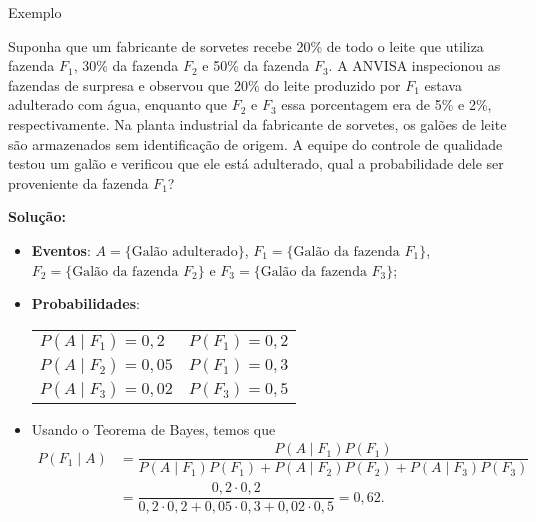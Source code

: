 \documentclass[9pt]{beamer}
\begin{document}
\begin{frame}{Exemplo}

{\scriptsize
Suponha que um fabricante de sorvetes recebe 20\% de todo o leite que utiliza fazenda $F_1$, 30\% da fazenda $F_2$ e 50\% da fazenda $F_3$. A ANVISA inspecionou as fazendas de surpresa e observou que 20\% do leite produzido por $F_1$ estava adulterado com água, enquanto que $F_2$ e $F_3$ essa porcentagem era de 5\% e 2\%, respectivamente. Na planta industrial da fabricante de sorvetes, os galões de leite são armazenados sem identificação de origem. A equipe do controle de qualidade testou um galão e verificou que ele está adulterado, qual a probabilidade dele ser proveniente da fazenda $F_1$?
\vfill

\textbf{Solução:}
	\begin{itemize}
	\item \textbf{Eventos}: $A=\{\mbox{Galão adulterado}\}$, $F_1 =\{\mbox{Galão da fazenda }F_1\}$, $F_2 =\{\mbox{Galão da fazenda }F_2\}$ e $F_3 =\{\mbox{Galão da fazenda }F_3\}$;
	\item \textbf{Probabilidades}:
	\begin{table}[ht]
		\begin{tabular}{l|l}
			\toprule[0.05cm]
			$P(A \mid F_1) = 0,2$ & $P(F_1) = 0,2$  \\
			$P(A \mid F_2) = 0,05$ & $P(F_1) = 0,3$  \\
			$P(A \mid F_3) = 0,02$ & $P(F_3) = 0,5$  \\
			\bottomrule[0.05cm]
		\end{tabular}
	\end{table}
	\item Usando o Teorema de Bayes, temos que
	\begin{align*}
	P(F_1 \mid A) &= \dfrac{ P(A \mid F_1) P(F_1) } {P(A \mid F_1) P(F_1) + P(A \mid F_2) P(F_2)+ P(A \mid F_3) P(F_3)}\\
	&= \dfrac{0,2 \cdot 0,2}{0,2 \cdot 0,2 + 0,05 \cdot 0,3 + 0,02 \cdot 0,5} = 0,62.
	\end{align*}
	\end{itemize}
}
\end{frame}
\end{document}
